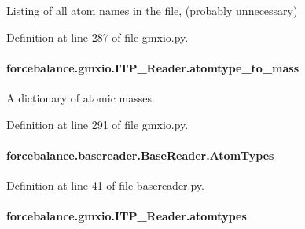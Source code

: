 Listing of all atom names in the file, (probably unnecessary) 



Definition at line 287 of file gmxio.\-py.

\hypertarget{classforcebalance_1_1gmxio_1_1ITP__Reader_ae4ae7fb78a864a7ca15f68b376e84c35}{
\paragraph[{atomtype\-\_\-to\-\_\-mass}]{\setlength{\rightskip}{0pt plus 5cm}forcebalance.\-gmxio.\-I\-T\-P\-\_\-\-Reader.\-atomtype\-\_\-to\-\_\-mass}}\label{classforcebalance_1_1gmxio_1_1ITP__Reader_ae4ae7fb78a864a7ca15f68b376e84c35}


A dictionary of atomic masses. 



Definition at line 291 of file gmxio.\-py.

\hypertarget{classforcebalance_1_1basereader_1_1BaseReader_ad5765e192499937376950410364014af}{
\paragraph[{Atom\-Types}]{\setlength{\rightskip}{0pt plus 5cm}forcebalance.\-basereader.\-Base\-Reader.\-Atom\-Types\hspace{0.3cm}{\ttfamily [inherited]}}}\label{classforcebalance_1_1basereader_1_1BaseReader_ad5765e192499937376950410364014af}


Definition at line 41 of file basereader.\-py.

\hypertarget{classforcebalance_1_1gmxio_1_1ITP__Reader_a771f60fa6b3020c422062bb9ceb51291}{
\paragraph[{atomtypes}]{\setlength{\rightskip}{0pt plus 5cm}forcebalance.\-gmxio.\-I\-T\-P\-\_\-\-Reader.\-atomtypes}}\label{classforcebalance_1_1gmxio_1_1ITP__Reader_a771f60fa6b3020c422062bb9ceb51291}



